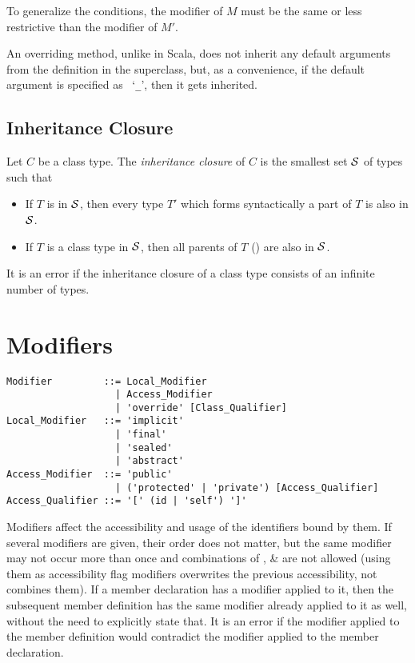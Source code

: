 To generalize the conditions, the modifier of $M$ must be the same or less restrictive than the modifier of $M'$. 

An overriding method, unlike in Scala, does not inherit any default arguments from the definition in the superclass, but, as a convenience, if the default argument is specified as ~`\lstinline!_!', then it gets inherited. 





\subsection{Inheritance Closure}
\label{sec:inheritance-closure}

\newcommand{\inheritclosure}{{\cal S}}

Let $C$ be a class type. The {\em inheritance closure} of $C$ is the smallest set $\inheritclosure$ of types such that
\begin{itemize}
\item If $T$ is in $\inheritclosure$, then every type $T'$ which forms syntactically a part of $T$ is also in $\inheritclosure$. 
\item If $T$ is a class type in $\inheritclosure$, then all parents of $T$ () are also in $\inheritclosure$. 
\end{itemize}
It is an error if the inheritance closure of a class type consists of an infinite number of types. 







\section{Modifiers}
\label{sec:modifiers}

\grammar\begin{lstlisting}
Modifier         ::= Local_Modifier
                   | Access_Modifier
                   | 'override' [Class_Qualifier]
Local_Modifier   ::= 'implicit'
                   | 'final'
                   | 'sealed'
                   | 'abstract'
Access_Modifier  ::= 'public'
                   | ('protected' | 'private') [Access_Qualifier]
Access_Qualifier ::= '[' (id | 'self') ']'
\end{lstlisting}

Modifiers affect the accessibility and usage of the identifiers bound by them. If several modifiers are given, their order does not matter, but the same modifier may not occur more than once and combinations of ,  \&  are not allowed (using them as accessibility flag modifiers overwrites the previous accessibility, not combines them). If a member declaration has a modifier applied to it, then the subsequent member definition has the same modifier already applied to it as well, without the need to explicitly state that. It is an error if the modifier applied to the member definition would contradict the modifier applied to the member declaration. 

